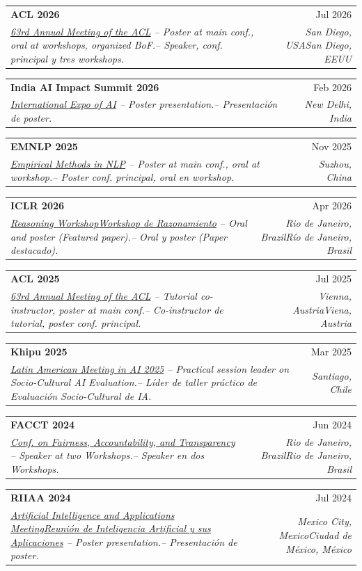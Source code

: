 \documentclass[letterpaper,10pt]{article}
\makeatletter
\newcommand{\lang}[2]{\ifeng #1\else #2\fi}
\def\faExternalLink{\faIcon{external-link-alt}}
\newcommand{\resumeSubheading}[4]{
  \item
    \begin{tabular*}{1.0\textwidth}[t]{l@{\extracolsep{\fill}}r}
      \textbf{#1} & \small #2 \\
      \textit{\small #3} & \textit{\small #4} \\
    \end{tabular*}
}
\makeatother
\begin{document}
    \resumeSubheading{ACL 2026 \href{https://2026.aclweb.org/}{\raisebox{-0.1\height}\faExternalLink}}{Jul 2026}
    {\small \underline{63rd Annual Meeting of the ACL} \lang{-- Poster at main conf., oral at workshops, organized BoF.}{-- Speaker, conf. principal y tres workshops.}}{\lang{San Diego, USA}{San Diego, EEUU}}

    \resumeSubheading{India AI Impact Summit 2026 \href{https://impact.indiaai.gov.in/}{\raisebox{-0.1\height}\faExternalLink}}{Feb 2026}
    {\small \underline{International Expo of AI} \lang{-- Poster presentation.}{-- Presentación de poster.}}{New Delhi, India}

    \resumeSubheading{EMNLP 2025 \href{https://2025.emnlp.org/}{\raisebox{-0.1\height}\faExternalLink}}{Nov 2025}
    {\small \underline{Empirical Methods in NLP} \lang{-- Poster at main conf., oral at workshop.}{-- Poster conf. principal, oral en workshop.}}{Suzhou, China}

    \resumeSubheading{ICLR 2026 \href{https://iclr.cc/}{\raisebox{-0.1\height}\faExternalLink}}{Apr 2026}
    {\small \underline{\lang{Reasoning Workshop}{Workshop de Razonamiento}} \lang{-- Oral and poster (Featured paper).}{-- Oral y poster (Paper destacado).}}{\lang{Rio de Janeiro, Brazil}{Río de Janeiro, Brasil}}

    \resumeSubheading{ACL 2025 \href{https://2025.aclweb.org/}{\raisebox{-0.1\height}\faExternalLink}}{Jul 2025}
    {\small \underline{63rd Annual Meeting of the ACL} \lang{-- Tutorial co-instructor, poster at main conf.}{-- Co-instructor de tutorial, poster conf. principal.}}{\lang{Vienna, Austria}{Viena, Austria}}

    \resumeSubheading{Khipu 2025 \href{https://khipu.ai/}{\raisebox{-0.1\height}\faExternalLink}}{Mar 2025}
    {\small \underline{Latin American Meeting in AI 2025} \lang{-- Practical session leader on Socio-Cultural AI Evaluation.}{-- Líder de taller práctico de Evaluación Socio-Cultural de IA.}}{Santiago, Chile}

    \resumeSubheading{FACCT 2024 \href{https://facctconference.org/2024/}{\raisebox{-0.1\height}\faExternalLink}}{Jun 2024}
    {\small \underline{Conf. on Fairness, Accountability, and Transparency} \lang{-- Speaker at two Workshops.}{-- Speaker en dos Workshops.}}{\lang{Rio de Janeiro, Brazil}{Rio de Janeiro, Brasil}}

    \resumeSubheading{RIIAA 2024 \href{https://riiaa.org/}{\raisebox{-0.1\height}\faExternalLink}}{Jul 2024}
    {\small \underline{\lang{Artificial Intelligence and Applications Meeting}{Reunión de Inteligencia Artificial y sus Aplicaciones}} \lang{-- Poster presentation.}{-- Presentación de poster.}}{\lang{Mexico City, Mexico}{Ciudad de México, México}}
\end{document}
